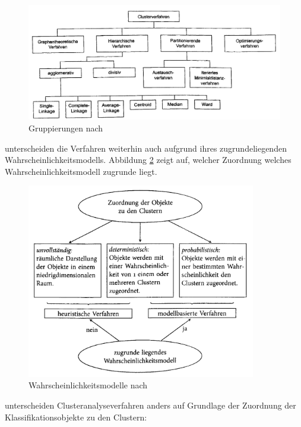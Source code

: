 \newpage %

\begin{figure}[h]
	\begin{center}
		\includegraphics[width=14cm]{pics/backhaus476.png}
	\end{center}
	\caption{Gruppierungen nach \citet[S. 476]{Backhaus.2016}}
	\label{pic:backhaus476}
\end{figure}

\citet[S. 21]{Bacher.2010} unterscheiden die Verfahren weiterhin auch aufgrund ihres zugrundeliegenden Wahrscheinlichkeitsmodells. Abbildung \ref{pic:bac20} zeigt auf, welcher Zuordnung welches Wahrscheinlichkeitsmodell zugrunde liegt. 

\begin{figure}[h]
	\begin{center}
		\includegraphics[width=10cm]{pics/bac20.png}
	\end{center}
	\caption{Wahrscheinlichkeitsmodelle nach \citet[S. 20]{Bacher.2010}}
	\label{pic:bac20}
\end{figure}

\citet[S. 18]{Bacher.2010} unterscheiden Clusteranalyseverfahren anders auf Grundlage der Zuordnung der Klassifikationsobjekte zu den Clustern:

